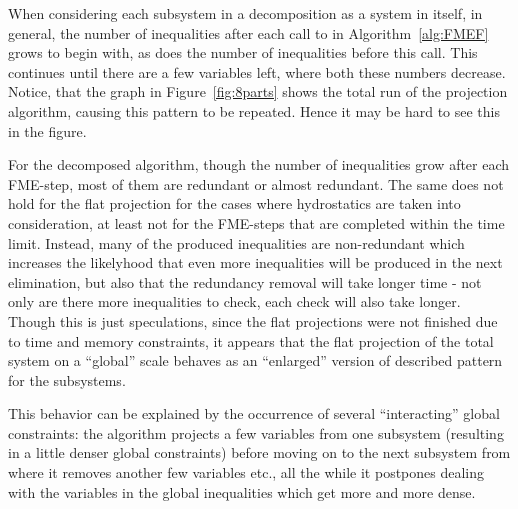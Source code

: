 When considering each subsystem in a decomposition as a system in itself, in general, the number of inequalities after each call to  in Algorithm~\ref{alg:FMEF} grows to begin with, as does the number of inequalities before this call. This continues until there are a few variables left, where both these numbers decrease. Notice, that the graph in Figure~\ref{fig:8parts} shows the total run of the projection algorithm, causing this pattern to be repeated. Hence it may be hard to see this in the figure.

For the decomposed algorithm, though the number of inequalities grow after each FME-step, most of them are redundant or almost redundant. The same does not hold for the flat projection for the cases where hydrostatics are taken into consideration, at least not for the FME-steps that are completed within the time limit. Instead, many of the produced inequalities are non-redundant which increases the likelyhood that even more inequalities will be produced in the next elimination, but also that the redundancy removal will take longer time - not only are there more inequalities to check, each check will also take longer. 
{Though this is just speculations, since the flat projections were not finished due to time and memory constraints, it appears that the flat projection of the total system on a ``global'' scale behaves as an ``enlarged'' version of described pattern for the subsystems.}

{This behavior can be explained by the occurrence of several ``interacting'' global constraints: the algorithm projects a few variables from one subsystem (resulting in a little denser global constraints) before moving on to the next subsystem from where it removes another few variables etc., all the while it postpones dealing with the variables in the global inequalities which get more and more dense.}

